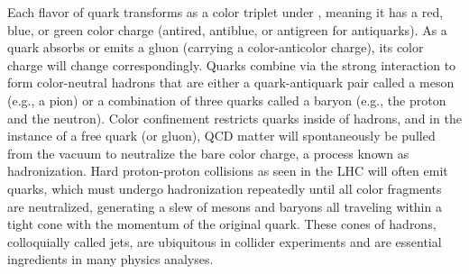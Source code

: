 Each flavor of quark transforms as a color triplet under \SUthreeC, meaning it has a red, blue, or green color charge (antired, antiblue, or antigreen for antiquarks). As a quark absorbs or emits a gluon (carrying a color-anticolor charge), its color charge will change correspondingly. Quarks combine via the strong interaction to form color-neutral hadrons that are either a quark-antiquark pair called a meson (e.g., a pion) or a combination of three quarks called a baryon (e.g., the proton and the neutron). Color confinement restricts quarks inside of hadrons, and in the instance of a free quark (or gluon), QCD matter will spontaneously be pulled from the vacuum to neutralize the bare color charge, a process known as hadronization. Hard proton-proton collisions as seen in the LHC will often emit quarks, which must undergo hadronization repeatedly until all color fragments are neutralized, generating a slew of mesons and baryons all traveling within a tight cone with the momentum of the original quark. These cones of hadrons, colloquially called jets, are ubiquitous in collider experiments and are essential ingredients in many physics analyses. 
